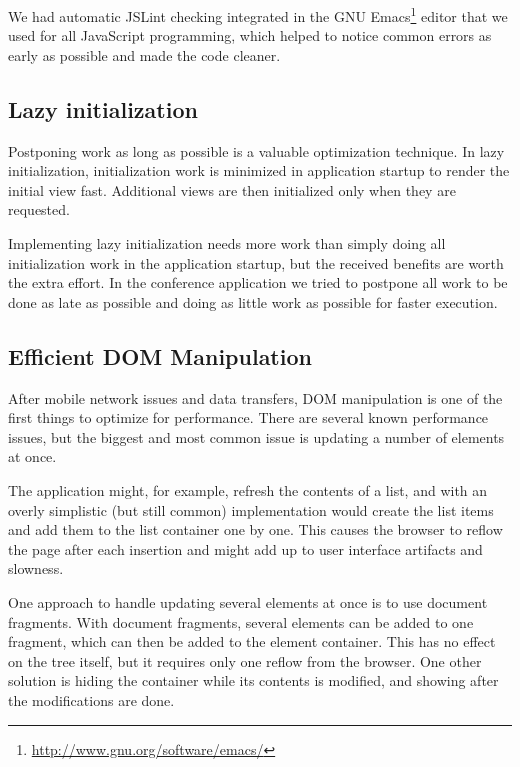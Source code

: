We had automatic JSLint checking integrated in the GNU
Emacs\footnote{\url{http://www.gnu.org/software/emacs/}} editor that
we used for all JavaScript programming, which helped to notice common
errors as early as possible and made the code cleaner.

\subsection{Lazy initialization}

Postponing work as long as possible is a valuable optimization
technique. In lazy initialization, initialization work is minimized in
application startup to render the initial view fast. Additional views
are then initialized only when they are requested.

Implementing lazy initialization needs more work than simply doing all
initialization work in the application startup, but the received
benefits are worth the extra effort. In the conference application we
tried to postpone all work to be done as late as possible and doing as
little work as possible for faster execution.

\subsection{Efficient DOM Manipulation}

After mobile network issues and data transfers, DOM manipulation is
one of the first things to optimize for performance. There are several
known performance issues, but the biggest and most common issue is
updating a number of elements at once. \cite{zakas2010high}

The application might, for example, refresh the contents of a list,
and with an overly simplistic (but still common) implementation would
create the list items and add them to the list container one by
one. This causes the browser to reflow the page after each insertion
and might add up to user interface artifacts and
slowness. \cite{zakas2010high}

One approach to handle updating several elements at once is to use
document fragments. With document fragments, several elements can be
added to one fragment, which can then be added to the element
container. This has no effect on the  tree itself, but it
requires only one reflow from the browser. One other solution is
hiding the container while its contents is modified, and showing after
the modifications are done. \cite{zakas2010high}


